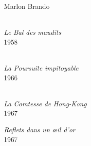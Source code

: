 \begin{center}
   {\figpagetitlename Marlon Brando}
\end{center}

\vspace*{\fill}

\noindent
\begin{minipage}[t]{0.327\textwidth}
  \begin{flushleft}
    \\[0.3em]
    {\figcaptionname\itshape Le Bal des maudits}\\[-6pt]
    {\figcaptiondetail\textup{1958}}
  \end{flushleft}
\end{minipage}
\hfill
\begin{minipage}[t]{0.327\textwidth}
  \begin{center}
    \\[0.3em]
    {\figcaptionname\itshape La Poursuite impitoyable}\\[-6pt]
    {\figcaptiondetail\textup{1966}}
  \end{center}
\end{minipage}
\hfill
\begin{minipage}[t]{0.327\textwidth}
  \begin{flushright}
    \\[0.3em]
    {\figcaptionname\itshape La Comtesse de Hong-Kong}\\[-6pt]
    {\figcaptiondetail\textup{1967}}
  \end{flushright}
\end{minipage}

\vspace{2\baselineskip}

\noindent
\begin{minipage}[t]{0.627\textwidth}
  \vspace{0pt}
  \raggedright
\end{minipage}
\hfill
\begin{minipage}[t]{0.333\textwidth}
  \vspace{0pt}
  \raggedright
  {\figcaptionname\itshape Reflets dans un œil d'or}\\[-6pt]
  {\figcaptiondetail\textup{1967}}
\end{minipage}


